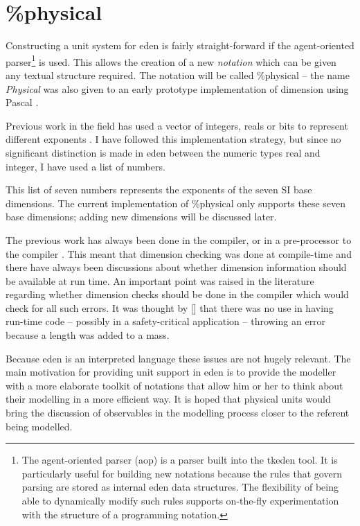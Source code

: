 \documentclass[a4paper]{article}
\begin{document}
\section{\%physical}
Constructing a unit system for eden is fairly straight-forward if the
agent-oriented parser\footnote{The agent-oriented parser (aop) is a parser 
built into the tkeden
tool. It is particularly useful for building new notations because the rules 
that govern
parsing are stored as internal eden data structures. The flexibility of being 
able to 
dynamically modify such rules supports on-the-fly experimentation with the 
structure of a 
programming notation.} is used.
 This allows the creation of a new \emph{notation} 
which can be given 
any textual structure required. The notation will be called \%physical -- the 
name \emph{Physical} was also 
given to an early prototype implementation of dimension using Pascal 
\cite{ME_physical}.

Previous work in the field has used a vector of integers, reals or bits to
represent different exponents \cite{ME_baldwin,ME_cleaveland,ME_hamilton}. I 
have followed this implementation strategy, but  since
no significant distinction is made in eden between the numeric types real and 
integer,
 I have used a list of numbers.

This list of seven numbers represents the exponents of the seven SI base 
dimensions. The current implementation of \%physical only supports these seven 
base dimensions;
 adding new dimensions will be discussed later.

The previous work has always been done in the compiler, or in a 
pre-processor to the compiler \cite{ME_physical}.
 This meant that dimension checking was done at compile-time and there 
 have always been discussions 
about whether dimension information should be available at run time. An 
important 
point was raised in the literature regarding whether dimension checks should 
be done in the compiler which would check for all such errors.
 It was thought by []
that there was no use in having
run-time code -- possibly in a safety-critical application  -- throwing an error
because a length was added to a mass. 

Because eden is an interpreted language these issues are not hugely relevant.
The main motivation for providing unit support in eden is to provide the 
modeller with a more elaborate toolkit of notations that allow him or her to 
think about their modelling in a more efficient way. It is hoped that physical
units would bring the discussion of observables in the modelling process closer 
to the referent being modelled.
\end{document}
